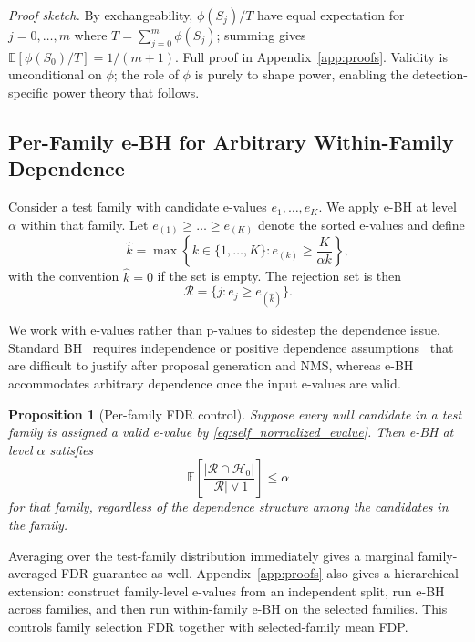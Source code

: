 \documentclass{article}
\newtheorem{proposition}{Proposition}
\theoremstyle{remark}
\newcommand{\E}{\mathbb{E}}
\newcommand{\1}{\mathbf{1}}
\newcommand{\R}{\mathcal{R}}
\newcommand{\Hnull}{\mathcal{H}_0}
\begin{document}
\emph{Proof sketch.} By exchangeability, $\phi(S_j)/T$ have equal
expectation for $j=0,\ldots,m$ where $T=\sum_{j=0}^m \phi(S_j)$;
summing gives $\E[\phi(S_0)/T]=1/(m{+}1)$. Full proof in
Appendix~\ref{app:proofs}. Validity is unconditional on $\phi$;
the role of $\phi$ is purely to shape power, enabling the
detection-specific power theory that follows.

\subsection{Per-Family e-BH for Arbitrary Within-Family Dependence}

Consider a test family with candidate e-values $e_1,\dots,e_K$. We apply e-BH at level $\alpha$ within that family. Let $e_{(1)} \ge \dots \ge e_{(K)}$ denote the sorted e-values and define
\begin{equation}
\hat{k} = \max\left\{k \in \{1,\dots,K\} : e_{(k)} \ge \frac{K}{\alpha k}\right\},
\end{equation}
with the convention $\hat{k}=0$ if the set is empty. The rejection set is then
\begin{equation}
\R = \{j : e_j \ge e_{(\hat{k})}\}.
\end{equation}

We work with e-values rather than p-values to sidestep the
dependence issue. Standard BH~\cite{benjamini1995controlling}
requires independence or positive dependence
assumptions~\cite{benjamini2001control} that are difficult to
justify after proposal generation and NMS, whereas
e-BH~\cite{wang2022false} accommodates arbitrary dependence once
the input e-values are valid.

\begin{proposition}[Per-family FDR control]
\label{prop:family_fdr}
Suppose every null candidate in a test family is assigned a valid e-value by \eqref{eq:self_normalized_evalue}. Then e-BH at level $\alpha$ satisfies
\begin{equation}
\E\left[\frac{|\R \cap \Hnull|}{|\R| \vee 1}\right] \le \alpha
\end{equation}
for that family, regardless of the dependence structure among the candidates in the family.
\end{proposition}

Averaging over the test-family distribution immediately gives a marginal
family-averaged FDR guarantee as well.
Appendix~\ref{app:proofs} also gives a hierarchical extension: construct
family-level e-values from an independent split, run e-BH across families, and
then run within-family e-BH on the selected families. This controls family
selection FDR together with selected-family mean FDP.
\end{document}
